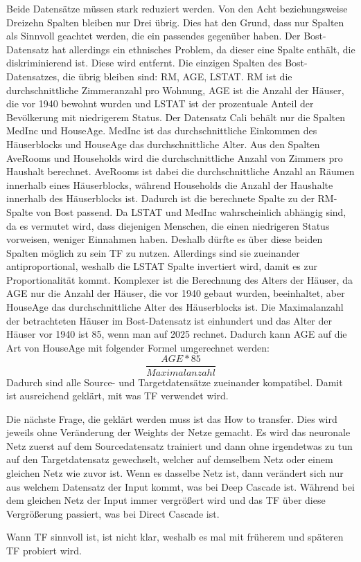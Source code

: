 Beide Datensätze müssen stark reduziert werden. Von den Acht beziehungsweise Dreizehn Spalten bleiben nur Drei übrig. Dies hat den Grund, dass 
nur Spalten als Sinnvoll geachtet werden, die ein passendes gegenüber haben. Der Bost-Datensatz hat allerdings ein ethnisches Problem, da 
dieser eine Spalte enthält, die diskriminierend ist. Diese wird entfernt. 
Die einzigen Spalten des Bost-Datensatzes, die übrig bleiben sind: RM, AGE, LSTAT. RM ist die durchschnittliche Zimmeranzahl pro Wohnung, AGE 
ist die Anzahl der Häuser, die vor 1940 bewohnt wurden und LSTAT ist der prozentuale Anteil der Bevölkerung mit niedrigerem Status. 
Der Datensatz Cali behält nur die Spalten MedInc und HouseAge. MedInc ist das durchschnittliche Einkommen des Häuserblocks und HouseAge das 
durchschnittliche Alter. Aus den Spalten AveRooms und Households wird die durchschnittliche Anzahl von Zimmers pro Haushalt berechnet. AveRooms 
ist dabei die durchschnittliche Anzahl an Räumen innerhalb eines Häuserblocks, während Households die Anzahl der Haushalte innerhalb des 
Häuserblocks ist. Dadurch ist die berechnete Spalte zu der RM-Spalte von Bost passend. 
Da LSTAT und MedInc wahrscheinlich abhängig sind, da es vermutet wird, dass diejenigen Menschen, die einen niedrigeren Status vorweisen, weniger 
Einnahmen haben. Deshalb dürfte es über diese beiden Spalten möglich zu sein TF zu nutzen. Allerdings sind sie zueinander antiproportional, 
weshalb die LSTAT Spalte invertiert wird, damit es zur Proportionalität kommt. Komplexer ist die Berechnung des Alters der Häuser, da 
AGE nur die Anzahl der Häuser, die vor 1940 gebaut wurden, beeinhaltet, aber HouseAge das durchschnittliche Alter des Häuserblocks ist. 
Die Maximalanzahl der betrachteten Häuser im Bost-Datensatz ist einhundert und das Alter der Häuser vor 1940 ist 85, wenn man auf 2025 rechnet. 
Dadurch kann AGE auf die Art von HouseAge mit folgender Formel umgerechnet werden: 
\begin{equation}
    \frac{AGE * 85}{Maximalanzahl}
\end{equation}
Dadurch sind alle Source- und Targetdatensätze zueinander kompatibel. Damit ist ausreichend geklärt, mit was TF verwendet wird. 

Die nächste Frage, die geklärt werden muss ist das How to transfer. Dies wird jeweils ohne Veränderung der Weights der Netze gemacht. 
Es wird das neuronale Netz zuerst auf dem Sourcedatensatz trainiert und dann ohne irgendetwas zu tun auf den Targetdatensatz gewechselt, 
welcher auf demselbem Netz oder einem gleichen Netz wie zuvor ist. Wenn es dasselbe Netz ist, dann verändert sich nur aus welchem 
Datensatz der Input kommt, was bei Deep Cascade ist. Während bei dem gleichen Netz der Input immer vergrößert wird und das TF über diese 
Vergrößerung passiert, was bei Direct Cascade ist. 

Wann TF sinnvoll ist, ist nicht klar, weshalb es mal mit früherem und späteren TF probiert wird. 
